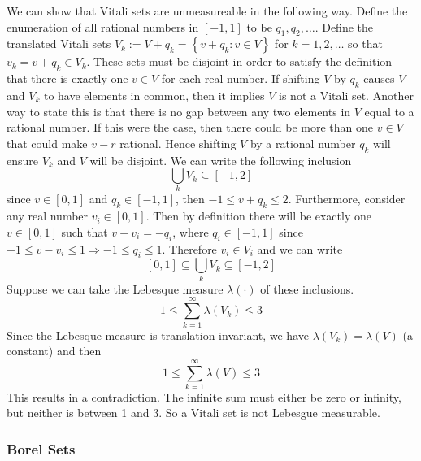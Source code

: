 \documentclass[11pt]{report} %
\begin{document}
We can show that Vitali sets are unmeasureable in the following way. Define the enumeration of all rational numbers in $\left[-1, 1\right]$ to be $q_{1}, q_{2}, \dots$. Define the translated Vitali sets $V_{k} := V + q_{k} = \left\{v + q_{k}: v \in V\right\}$ for $k = 1, 2, \dots$ so that $v_{k} = v + q_{k} \in V_{k}$. These sets must be disjoint in order to satisfy the definition that there is exactly one $v \in V$ for each real number. If shifting $V$ by $q_{k}$ causes $V$ and $V_{k}$ to have elements in common, then it implies $V$ is not a Vitali set. Another way to state this is that there is no gap between any two elements in $V$ equal to a rational number. If this were the case, then there could be more than one $v \in V$ that could make $v - r$ rational. Hence shifting $V$ by a rational number $q_{k}$ will ensure $V_{k}$ and $V$ will be disjoint. We can write the following inclusion
\begin{equation}
\bigcup_{k}V_{k} \subseteq \left[-1, 2\right]
\end{equation}
since $v \in \left[0, 1\right]$ and $q_{k} \in \left[-1, 1\right]$, then $-1 \leq v + q_{k} \leq 2$. Furthermore, consider any real number $v_{i} \in \left[0, 1\right]$. Then by definition there will be exactly one $v \in \left[0, 1\right]$ such that $v - v_{i} = -q_{i}$, where $q_{i} \in \left[-1,1\right]$ since $-1 \leq v - v_{i} \leq 1 \Rightarrow -1 \leq q_{i} \leq 1$. Therefore $v_{i} \in V_{i}$ and we can write
\begin{equation}
\left[0, 1\right] \subseteq \bigcup_{k}V_{k} \subseteq \left[-1, 2\right]
\end{equation}
Suppose we can take the Lebesque measure $\lambda\left(\cdot\right)$ of these inclusions.
\begin{equation}
1 \leq \sum_{k = 1}^{\infty}\lambda\left(V_{k}\right) \leq 3
\end{equation}
Since the Lebesque measure is translation invariant, we have $\lambda\left(V_{k}\right) = \lambda\left(V\right)$ (a constant) and then
\begin{equation}
1 \leq \sum_{k = 1}^{\infty}\lambda\left(V\right) \leq 3
\end{equation}
This results in a contradiction. The infinite sum must either be zero or infinity, but neither is between 1 and 3. So a Vitali set is not Lebesgue measurable.

\subsubsection{Borel Sets}
\end{document}
